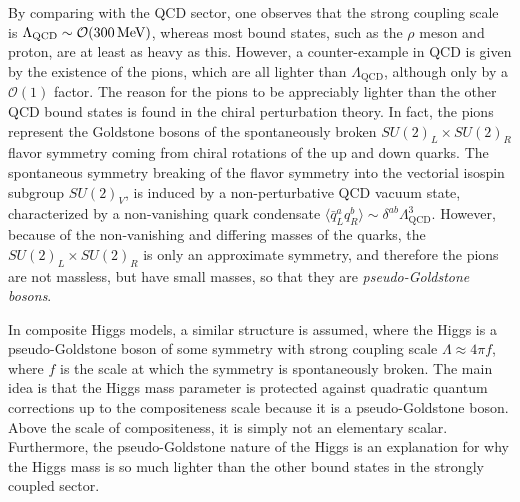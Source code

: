 By comparing with the QCD sector, one observes that the strong coupling scale is $\Lambda_\mathrm{QCD} \sim \mathcal{O}(300\,\text{Me\hspace{-.08em}V})$, whereas most bound states, such as the $\rho$ meson and proton, are at least as heavy as this.
However, a counter-example in QCD is given by the existence of the pions, which are all lighter than $\Lambda_\mathrm{QCD}$, although only by a $\mathcal{O}(1)$ factor.
The reason for the pions to be appreciably lighter than the other QCD bound states is found in the chiral perturbation theory. 
In fact, the pions represent the Goldstone bosons of the spontaneously broken $SU(2)_L \times SU(2)_R$ flavor symmetry coming from chiral rotations of the up and down quarks. 
The spontaneous symmetry breaking of the flavor symmetry into the vectorial isospin subgroup $SU(2)_V$, is induced by a non-perturbative QCD vacuum state, characterized by a non-vanishing quark condensate $\langle \bar{q}^a_L q^b_R \rangle \sim \delta^{ab}\Lambda^3_\mathrm{QCD}$.
However, because of the non-vanishing and differing masses of the quarks, the $SU(2)_L \times SU(2)_R$ is only an approximate symmetry, and therefore the pions are not massless, but have small masses, so that they are \textit{pseudo-Goldstone bosons}.

In composite Higgs models, a similar structure is assumed, where the Higgs is a pseudo-Goldstone boson of some symmetry with strong coupling scale $\Lambda \approx 4\pi f$,
where $f$ is the scale at which the symmetry is spontaneously broken.
The main idea is that the Higgs mass parameter is protected against quadratic quantum corrections up to the compositeness scale because it is a pseudo-Goldstone boson. 
Above the scale of compositeness, it is simply not an elementary scalar.
Furthermore, the pseudo-Goldstone nature of the Higgs is an explanation for why the Higgs mass is so much lighter than the other bound states in the strongly coupled sector.

